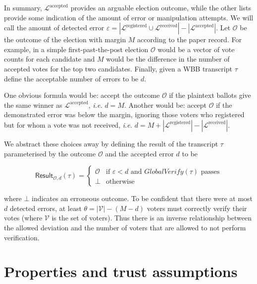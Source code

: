 \documentclass[12pt,a4paper]{article}
\theoremstyle{definition}
\newcommand{\ie}{\textit{i.e. }}
\begin{document}
In summary, $\mathcal{L}^{\text{accepted}}$ provides an arguable election outcome, while the other lists provide some indication of the amount of error or manipulation attempts. We will call the amount of detected error $\varepsilon = |\mathcal{L}^{\text{registered}} \cup \mathcal{L}^{\text{received}}| - |\mathcal{L}^{\text{accepted}}|$. Let $\mathcal{O}$ be the outcome of the election with margin $M$ according to the paper record. For example, in a simple first-past-the-post election $\mathcal{O}$ would be a vector of vote counts for each candidate and $M$ would be the difference in the number of accepted votes for the top two candidates. Finally, given a WBB transcript $\tau$ define the acceptable number of errors to be $d$.

One obvious formula would be: accept the outcome $\mathcal{O}$ if the plaintext ballots give the same winner as $\mathcal{L}^{\text{accepted}}$, \ie $d = M$. Another would be: accept $\mathcal{O}$ if the demonstrated error was below the margin, ignoring those voters who registered but for whom a vote was not received, \ie $d = M + |\mathcal{L}^{\text{registered}}| - |\mathcal{L}^{\text{received}}|$.

We abstract these choices away by defining the result of the transcript $\tau$ parameterised by the outcome $\mathcal{O}$ and the accepted error $d$ to be

$$\mathsf{Result}_{\mathcal{O}, d}(\tau) =
\begin{cases}
    \mathcal{O} & \text{if } \varepsilon < d \text{ and } \mathit{GlobalVerify}(\tau) \text{ passes} \\
    \bot        & \text{otherwise}
\end{cases}$$

where $\bot$ indicates an erroneous outcome. To be confident that there were at most $d$ detected errors, at least $\theta = |\mathcal{V}| - (M - d)$ voters must correctly verify their votes (where $\mathcal{V}$ is the set of voters). Thus there is an inverse relationship between the allowed deviation and the number of voters that are allowed to not perform verification.

\section{Properties and trust assumptions}\label{sec-properties}
\end{document}
